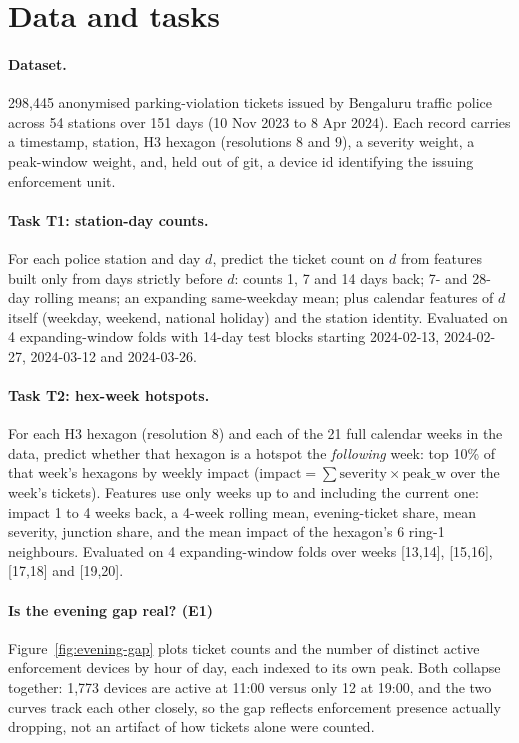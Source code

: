 \section{Data and tasks}
\label{sec:data}

\paragraph{Dataset.} 298{,}445 anonymised parking-violation tickets issued by Bengaluru traffic
police across 54 stations over 151 days (10 Nov 2023 to 8 Apr 2024). Each record carries a
timestamp, station, H3 hexagon (resolutions 8 and 9), a severity weight, a peak-window weight,
and, held out of git, a device id identifying the issuing enforcement unit.

\paragraph{Task T1: station-day counts.} For each police station and day $d$, predict the ticket
count on $d$ from features built only from days strictly before $d$: counts 1, 7 and 14 days
back; 7- and 28-day rolling means; an expanding same-weekday mean; plus calendar features of $d$
itself (weekday, weekend, national holiday) and the station identity. Evaluated on 4
expanding-window folds with 14-day test blocks starting 2024-02-13, 2024-02-27, 2024-03-12 and
2024-03-26.

\paragraph{Task T2: hex-week hotspots.} For each H3 hexagon (resolution 8) and each of the 21
full calendar weeks in the data, predict whether that hexagon is a hotspot the \emph{following}
week: top 10\% of that week's hexagons by weekly impact
($\text{impact} = \sum \text{severity} \times \text{peak\_w}$ over the week's tickets). Features
use only weeks up to and including the current one: impact 1 to 4 weeks back, a 4-week rolling
mean, evening-ticket share, mean severity, junction share, and the mean impact of the hexagon's 6
ring-1 neighbours. Evaluated on 4 expanding-window folds over weeks [13,14], [15,16], [17,18] and
[19,20].

\paragraph{Is the evening gap real? (E1)} Figure~\ref{fig:evening-gap} plots ticket counts and
the number of distinct active enforcement devices by hour of day, each indexed to its own peak.
Both collapse together: 1{,}773 devices are active at 11:00 versus only 12 at 19:00, and the two
curves track each other closely, so the gap reflects enforcement presence actually dropping, not
an artifact of how tickets alone were counted.

